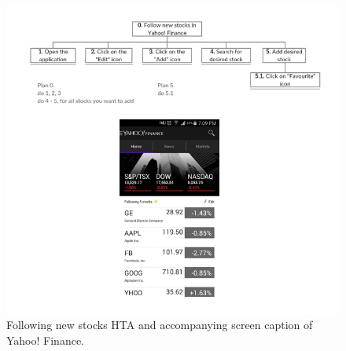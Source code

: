 \documentclass{sigchi}
\begin{document}
\begin{figure}
	\begin{center}
		\includegraphics[width=\textwidth]{HTA_SC_1_Yahoo}
	\end{center}
	\caption{Following new stocks HTA and accompanying screen caption of Yahoo! Finance.}
	\label{fig:figure7}
\end{figure}
\end{document}
